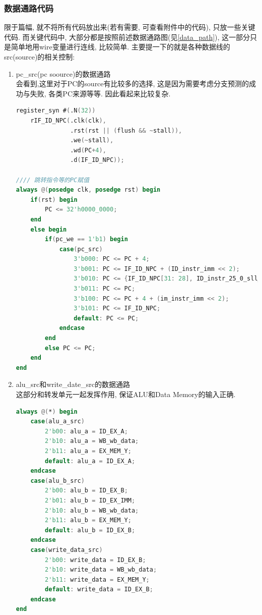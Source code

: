 \documentclass[UTF8]{article}
\begin{document}
\subsubsection{数据通路代码}
限于篇幅, 就不将所有代码放出来(若有需要, 可查看附件中的代码), 只放一些关键代码.
而关键代码中, 大部分都是按照前述数据通路图(见\ref{data_path}), 这一部分只是简单地用wire变量进行连线, 比较简单. 主要提一下的就是各种数据线的src(source)的相关控制:
\begin{enumerate}
	\item pc\_src(pc soource)的数据通路\\
	会看到,这里对于PC的source有比较多的选择, 这是因为需要考虑分支预测的成功与失败, 各类PC来源等等. 因此看起来比较复杂.
	\begin{lstlisting}[language=verilog]
register_syn #(.N(32)) 
    rIF_ID_NPC(.clk(clk),
               .rst(rst || (flush && ~stall)),
               .we(~stall),
               .wd(PC+4),
               .d(IF_ID_NPC));

//// 跳转指令等的PC赋值
always @(posedge clk, posedge rst) begin
    if(rst) begin
        PC <= 32'h0000_0000;
    end
    else begin
        if(pc_we == 1'b1) begin
            case(pc_src)
                3'b000: PC <= PC + 4;
                3'b001: PC <= IF_ID_NPC + (ID_instr_imm << 2);
                3'b010: PC <= {IF_ID_NPC[31: 28], ID_instr_25_0_sll_2};
                3'b011: PC <= PC;
                3'b100: PC <= PC + 4 + (im_instr_imm << 2);
                3'b101: PC <= IF_ID_NPC;
                default: PC <= PC;
            endcase
        end
        else PC <= PC;
    end
end
	\end{lstlisting}
	\item alu\_src和write\_date\_src的数据通路\\
	这部分和转发单元一起发挥作用, 保证ALU和Data Memory的输入正确.
	\begin{lstlisting}[language=verilog]
always @(*) begin
    case(alu_a_src)
        2'b00: alu_a = ID_EX_A;
        2'b10: alu_a = WB_wb_data;
        2'b11: alu_a = EX_MEM_Y;
        default: alu_a = ID_EX_A;
    endcase
    case(alu_b_src)
        2'b00: alu_b = ID_EX_B;
        2'b01: alu_b = ID_EX_IMM;
        2'b10: alu_b = WB_wb_data;
        2'b11: alu_b = EX_MEM_Y;
        default: alu_b = ID_EX_B;
    endcase
    case(write_data_src)
        2'b00: write_data = ID_EX_B;
        2'b10: write_data = WB_wb_data;
        2'b11: write_data = EX_MEM_Y;
        default: write_data = ID_EX_B;
    endcase
end
	\end{lstlisting}
\end{enumerate}
\end{document}
